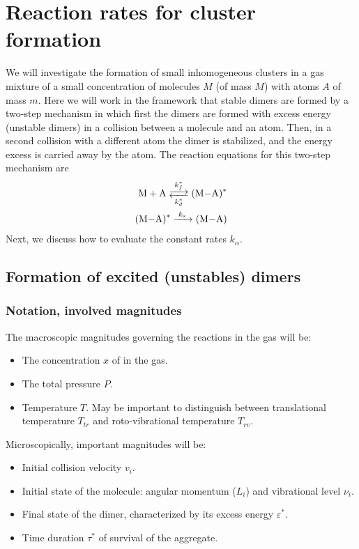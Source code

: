 \chapter{Reaction rates for cluster formation}
\label{C:react-rates-cluster}
We will investigate the formation of small inhomogeneous clusters in a gas mixture of a small concentration of molecules $M$ (of mass $M$) with atoms $A$ of mass $m$.
Here we will work in the framework that stable dimers are formed by a two-step mechanism in which first the dimers are formed with excess energy (unstable dimers) in a collision between a molecule and an atom. Then, in a second collision with a different atom the dimer is stabilized, and the energy excess is carried away by the atom. The reaction equations for this two-step mechanism are
\begin{subequations}
\begin{align}
  \label{Q:rates-master-equation-a}
  \ce{M + A <-->[{k_{f}^{*}}][{k_{d}^{*}}] (M-A)^{*}} \\
  \label{Q:rates-master-equation-b}
  \ce{ (M-A)^{*} ->[{k_{s}}] (M-A)} 
\end{align}
\end{subequations}
%
Next, we discuss how to evaluate the constant rates $k_{\alpha}$.

\section{Formation of excited (unstables) dimers}
\label{S:excit-unst-dimers}

\subsection{Notation, involved magnitudes}
\label{S:cant-de-inter}

The macroscopic magnitudes governing the reactions in the gas will be:
\begin{itemize}
\item The concentration $x$ of  in the gas.
\item The total pressure $P$.
\item Temperature $T$. May be important to distinguish between translational temperature $T_{tr}$ and roto-vibrational temperature $T_{rv}$.
\end{itemize}

Microscopically, important magnitudes will be:
\begin{itemize}
\item Initial collision velocity $v_{i}$.
\item Initial state of the molecule: angular momentum ($L_{i}$) and vibrational level $\nu_{i}$.
\item Final state of the dimer, characterized by its excess energy $\varepsilon^{*}$.
\item Time duration $\tau^{*}$ of survival of the aggregate.
\end{itemize}

